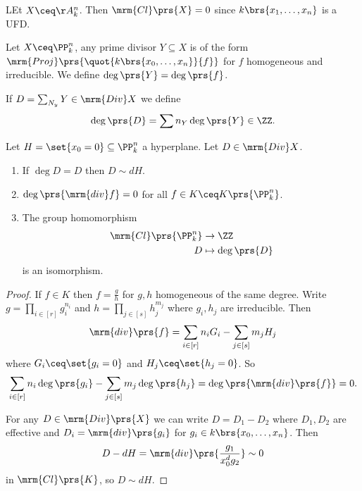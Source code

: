\documentclass[10pt,a4paper,twoside,openany,hidelinks]{book}
\begin{document}
\begin{example}
LEt $X \ceq \AA_k^n$. Then $\mrm{Cl}\prs{X} = 0$ since $k\brs{x_1, \ldots, x_n}$ is a UFD.
\end{example}

\begin{definition}
Let $X \ceq \PP_k^n$, any prime divisor $Y \subseteq X$ is of the form $\mrm{Proj}\prs{\quot{k\brs{x_0, \ldots, x_n}}{f}}$ for $f$ homogeneous and irreducible. We define $\deg\prs{Y} = \deg\prs{f}$.

If $D = \sum_{N_y} Y \in \mrm{Div} X$ we define
\[\deg\prs{D} = \sum n_Y \deg\prs{Y} \in \ZZ \text{.}\]
\end{definition}

\begin{proposition}
Let $H = \set{x_0 = 0} \subseteq \PP_k^n$ a hyperplane.
Let $D \in \mrm{Div} X$.
\begin{enumerate}
\item If $\deg D = D$ then $D \sim d H$.
\item $\deg\prs{\mrm{div} f} = 0$ for all $f \in K \ceq K\prs{\PP_k^n}$.
\item The group homomorphism
\begin{align*}
\mrm{Cl}\prs{\PP_k^n} &\to \ZZ \\
D &\mapsto \deg\prs{D}
\end{align*}
is an isomorphism.
\end{enumerate}
\end{proposition}

\begin{proof}
If $f \in K$ then $f = \frac{g}{h}$ for $g,h$ homogeneous of the same degree.
Write $g = \prod_{i \in [r]} g_i^{n_i}$ and $h = \prod_{j \in [s]} h_j^{m_j}$ where $g_i, h_j$ are irreducible.
Then \[\mrm{div}\prs{f} = \sum_{i \in [r]} n_i G_i - \sum_{j \in [s]} m_j H_j\]
where $G_i \ceq \set{g_i = 0}$ and $H_j \ceq \set{h_j = 0}$. So \[\sum_{i \in [r]} n_i \deg \prs{g_i} - \sum_{j \in [s]} m_j \deg\prs{h_j} = \deg\prs{\mrm{div}\prs{f}} = 0 \text{.}\]

For any $D \in \mrm{Div}\prs{X}$ we can write $D = D_1 - D_2$ where $D_1, D_2$ are effective and $D_i = \mrm{div}\prs{g_i}$ for $g_i \in k\brs{x_0, \ldots, x_n}$.
Then
\[D - dH = \mrm{div}\prs{\frac{g_1}{x_0^d g_2}} \sim 0\]
in $\mrm{Cl}\prs{K}$, so $D \sim dH$.
\end{proof}
\end{document}
